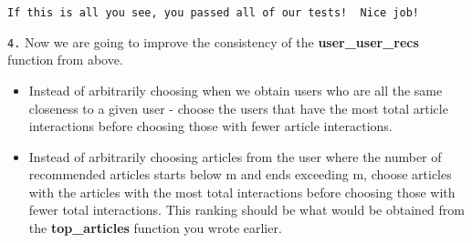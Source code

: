 \documentclass[11pt]{article}
\begin{document}
    \begin{Verbatim}[commandchars=\\\{\}]
If this is all you see, you passed all of our tests!  Nice job!

    \end{Verbatim}

    \texttt{4.} Now we are going to improve the consistency of the
\textbf{user\_user\_recs} function from above.

\begin{itemize}
\item
  Instead of arbitrarily choosing when we obtain users who are all the
  same closeness to a given user - choose the users that have the most
  total article interactions before choosing those with fewer article
  interactions.
\item
  Instead of arbitrarily choosing articles from the user where the
  number of recommended articles starts below m and ends exceeding m,
  choose articles with the articles with the most total interactions
  before choosing those with fewer total interactions. This ranking
  should be what would be obtained from the \textbf{top\_articles}
  function you wrote earlier.
\end{itemize}
\end{document}
